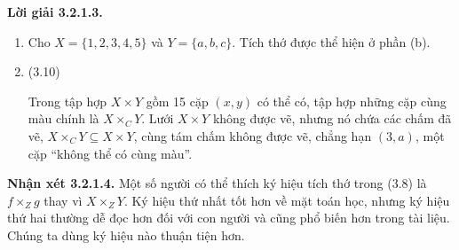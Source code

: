 \noindent\textbf{Lời giải 3.2.1.3.}\keepwithnext
\begin{enumerate}[label=\alph*.]
\item Cho $X=\{1,2,3,4,5\}$ và $Y=\{a,b,c\}$. Tích thớ được thể hiện ở phần (b).
\item %
\begin{center}\hfill(3.10)\end{center}
Trong tập hợp $X\times Y$ gồm 15 cặp $(x,y)$ có thể có, tập hợp những cặp cùng màu chính là $X\times_CY$. Lưới $X\times Y$ không được vẽ, nhưng nó chứa các chấm đã vẽ, $X\times_CY\subseteq X\times Y$, cùng tám chấm không được vẽ, chẳng hạn $(3,a)$, một cặp ``không thể có cùng màu''.
\end{enumerate}

\noindent\textbf{Nhận xét 3.2.1.4.} Một số người có thể thích ký hiệu tích thớ trong (3.8) là $f\times_Zg$ thay vì $X\times_ZY$. Ký hiệu thứ nhất tốt hơn về mặt toán học, nhưng ký hiệu thứ hai thường dễ đọc hơn đối với con người và cũng phổ biến hơn trong tài liệu. Chúng ta dùng ký hiệu nào thuận tiện hơn.

